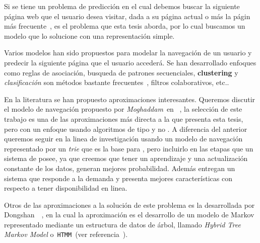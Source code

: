 

Si se tiene un problema de predicción en el cual debemos buscar la siguiente página web que el usuario desea visitar, dada a su página actual o más la págin más frecuente~\cite{Poornalatha2012}, es el problema que esta tesis aborda, por lo cual buscamos un modelo que lo solucione con una representación simple.


Varios modelos han sido propuestos para modelar la navegación de un usuario y predecir la siguiente página que el usuario accederá. Se han desarrollado enfoques como  reglas de asociación, busqueda de patrones secuenciales, \textbf{clustering} y \emph{clasificación} son métodos bastante frecuentes~\cite{Moghaddam2009}, filtros colaborativos, etc.. 


En la literatura se han propuesto aproximaciones interesantes. Queremos discutir el modelo de navegación propuesto por \emph{Moghaddam}~\etal en ~\cite{Moghaddam2009}, la selección de este trabajo es una de las aproximaciones más directa a la que presenta esta tesis, pero con un enfoque usando algoritmos de tipo \losslessdatacompression y no \machinelearning. A  diferencia del anterior queremos seguir en la linea de investigación usando un modelo de navegación representado por un \emph{trie} que es la base para \lzSieteOcho, pero incluirlo en las etapas que un sistema de \machinelearning posee, ya que creemos que tener un aprendizaje  y una actualización constante de los datos, generan mejores  probabilidad. Además entregan un sistema que responde a la demanda y presenta mejores características con respecto a tener disponibilidad en linea.

Otros de las aproximaciones a la solución de este problema es la desarrollada por {Dongshan}~\etal~\cite{Dongshan2002}, en la cual la aproximación es el desarrollo de un modelo de Markov representado mediante un estructura de datos de árbol, llamado \emph{Hybrid Tree Markov Model} o~\texttt{HTMM}~(ver referencia~\cite{Dongshan2002}).
\uncm
 



